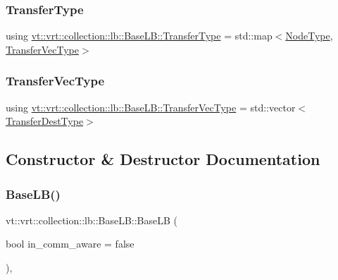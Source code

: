\subsubsection{\texorpdfstring{Transfer\+Type}{TransferType}}
{\footnotesize\ttfamily using \hyperlink{structvt_1_1vrt_1_1collection_1_1lb_1_1_base_l_b_a0a5f834082d85c558bdaf84c464c1ead}{vt\+::vrt\+::collection\+::lb\+::\+Base\+L\+B\+::\+Transfer\+Type} =  std\+::map$<$\hyperlink{namespacevt_a866da9d0efc19c0a1ce79e9e492f47e2}{Node\+Type}, \hyperlink{structvt_1_1vrt_1_1collection_1_1lb_1_1_base_l_b_a329e8179ec41a1bd4924c79fe23a79af}{Transfer\+Vec\+Type}$>$}

\mbox{\label{structvt_1_1vrt_1_1collection_1_1lb_1_1_base_l_b_a329e8179ec41a1bd4924c79fe23a79af}} 
\subsubsection{\texorpdfstring{Transfer\+Vec\+Type}{TransferVecType}}
{\footnotesize\ttfamily using \hyperlink{structvt_1_1vrt_1_1collection_1_1lb_1_1_base_l_b_a329e8179ec41a1bd4924c79fe23a79af}{vt\+::vrt\+::collection\+::lb\+::\+Base\+L\+B\+::\+Transfer\+Vec\+Type} =  std\+::vector$<$\hyperlink{structvt_1_1vrt_1_1collection_1_1lb_1_1_base_l_b_add886785f64ea725005f1263fd1393be}{Transfer\+Dest\+Type}$>$}



\subsection{Constructor \& Destructor Documentation}
\mbox{\label{structvt_1_1vrt_1_1collection_1_1lb_1_1_base_l_b_a96ad04c03781fc057dbfb9049f67530f}} 
\subsubsection{\texorpdfstring{Base\+L\+B()}{BaseLB()}\hspace{0.1cm}{\footnotesize\ttfamily [1/3]}}
{\footnotesize\ttfamily vt\+::vrt\+::collection\+::lb\+::\+Base\+L\+B\+::\+Base\+LB (\begin{DoxyParamCaption}\item[{bool}]{in\+\_\+comm\+\_\+aware = {\ttfamily false} }\end{DoxyParamCaption})\hspace{0.3cm}{\ttfamily [inline]}, {\ttfamily [explicit]}}

